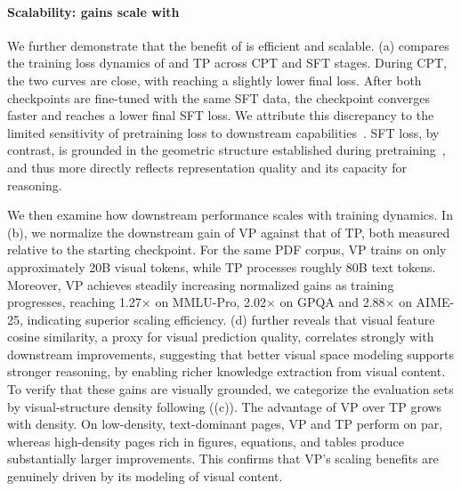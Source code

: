 \paragraph{Scalability: gains scale with \methodname }
\label{sec:results_scaling}

We further demonstrate that the benefit of \methodname is efficient and scalable. 
(a) compares the training loss dynamics of \methodname and TP across CPT and SFT stages.
During CPT, the two curves are close, with \methodname reaching a slightly lower final loss. 
After both checkpoints are fine-tuned with the same SFT data, 
the \methodname checkpoint converges faster and reaches a lower final SFT loss.
We attribute this discrepancy to the limited sensitivity of pretraining loss to downstream capabilities~\citep{wei2022emergent}. 
SFT loss, by contrast, is grounded in the geometric structure established during pretraining~\citep{li2026tracing}, 
and thus more directly reflects representation quality and its capacity for reasoning.

We then examine how downstream performance scales with training dynamics. 
In (b), we normalize the downstream gain of VP against that of TP, both measured relative to the starting checkpoint. 
For the same PDF corpus, VP trains on only approximately 20B visual tokens, while TP processes roughly 80B text tokens.
Moreover, VP achieves steadily increasing normalized gains as training progresses, 
reaching 1.27× on MMLU-Pro, 2.02× on GPQA and 2.88× on AIME-25, indicating superior scaling efficiency.
(d) further reveals that visual feature cosine similarity, 
a proxy for visual prediction quality, correlates strongly with downstream improvements, 
suggesting that better visual space modeling supports stronger reasoning, by enabling richer knowledge extraction from visual content.
To verify that these gains are visually grounded, 
we categorize the evaluation sets by visual-structure density following \citet{masry2025chartqapro} ((c)). 
The advantage of VP over TP grows with density. 
On low-density, text-dominant pages, VP and TP perform on par, whereas high-density pages rich in figures,
equations, and tables produce substantially larger improvements. 
This confirms that VP's scaling benefits are genuinely driven by its modeling of visual content.




